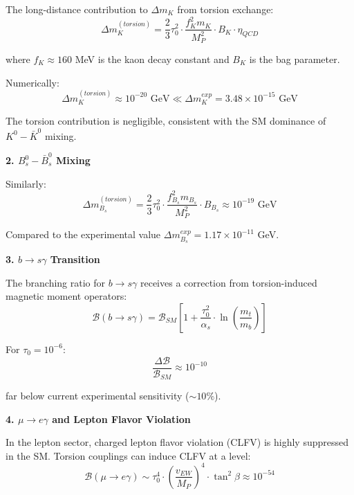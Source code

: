 The long-distance contribution to $\Delta m_K$ from torsion exchange:
\begin{equation}
    \Delta m_K^{(torsion)} = \frac{2}{3} \tau_0^2 \cdot \frac{f_K^2 m_K}{M_P^2} \cdot B_K \cdot \eta_{QCD}
\end{equation}

where $f_K \approx 160$ MeV is the kaon decay constant and $B_K$ is the bag parameter.

Numerically:
\begin{equation}
    \Delta m_K^{(torsion)} \approx 10^{-20} \text{ GeV} \ll \Delta m_K^{exp} = 3.48 \times 10^{-15} \text{ GeV}
\end{equation}

The torsion contribution is negligible, consistent with the SM dominance of $K^0 - \bar{K}^0$ mixing.

\textbf{2. $B_s^0 - \bar{B}_s^0$ Mixing}

Similarly:
\begin{equation}
    \Delta m_{B_s}^{(torsion)} = \frac{2}{3} \tau_0^2 \cdot \frac{f_{B_s}^2 m_{B_s}}{M_P^2} \cdot B_{B_s} \approx 10^{-19} \text{ GeV}
\end{equation}

Compared to the experimental value $\Delta m_{B_s}^{exp} = 1.17 \times 10^{-11}$ GeV.

\textbf{3. $b \to s \gamma$ Transition}

The branching ratio for $b \to s \gamma$ receives a correction from torsion-induced magnetic moment operators:
\begin{equation}
    \mathcal{B}(b \to s \gamma) = \mathcal{B}_{SM} \left[1 + \frac{\tau_0^2}{\alpha_s} \cdot \ln\left(\frac{m_t}{m_b}\right)\right]
\end{equation}

For $\tau_0 = 10^{-6}$:
\begin{equation}
    \frac{\Delta \mathcal{B}}{\mathcal{B}_{SM}} \approx 10^{-10}
\end{equation}

far below current experimental sensitivity ($\sim 10\%$).

\textbf{4. $\mu \to e \gamma$ and Lepton Flavor Violation}

In the lepton sector, charged lepton flavor violation (CLFV) is highly suppressed in the SM. Torsion couplings can induce CLFV at a level:
\begin{equation}
    \mathcal{B}(\mu \to e \gamma) \sim \tau_0^4 \cdot \left(\frac{v_{EW}}{M_P}\right)^4 \cdot \tan^2\beta \approx 10^{-54}
\end{equation}

